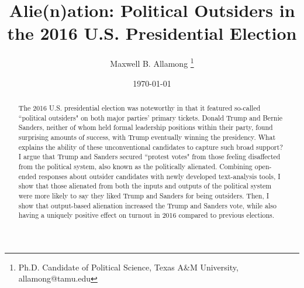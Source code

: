 \documentclass[12pt]{article}
\title{Alie(n)ation: Political Outsiders in the 2016 U.S. Presidential Election}
\author{Maxwell B. Allamong \thanks{Ph.D. Candidate of Political Science, Texas A\&M University, allamong@tamu.edu
} }
\date{\today}
\begin{document}
\maketitle
{}
\thispagestyle{empty}
\doublespacing





\begin{abstract}  
The 2016 U.S. presidential election was noteworthy in that it featured so-called ``political outsiders" on both major parties' primary tickets. Donald Trump and Bernie Sanders, neither of whom held formal leadership positions within their party, found surprising amounts of success, with Trump eventually winning the presidency. What explains the ability of these unconventional candidates to capture such broad support? I argue that Trump and Sanders secured ``protest votes" from those feeling disaffected from the political system, also known as the politically alienated. Combining open-ended responses about outsider candidates with newly developed text-analysis tools, I show that those alienated from both the inputs and outputs of the political system were more likely to say they liked Trump and Sanders for being outsiders. Then, I show that output-based alienation increased the Trump and Sanders vote, while also having a uniquely positive effect on turnout in 2016 compared to previous elections.


\end{abstract}\clearpage{}
\end{document}
